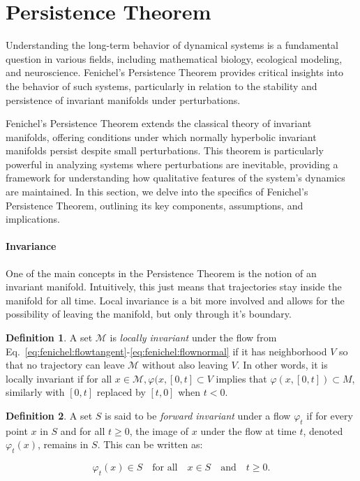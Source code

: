 \documentclass{article} %
\newcounter{ct}
\newcommand{\manifold}{\mathcal{M}}
\theoremstyle{definition}
\newtheorem{definition}{Definition}
\theoremstyle{remark}
\begin{document}
\newpage
\section{Persistence Theorem}\label{sec:supp:persistence_extra}
Understanding the long-term behavior of dynamical systems is a fundamental question in various fields, including mathematical biology, ecological modeling, and neuroscience.
 Fenichel's Persistence Theorem provides critical insights into the behavior of such systems, particularly in relation to the stability and persistence of invariant manifolds under perturbations.

Fenichel's Persistence Theorem extends the classical theory of invariant manifolds, offering conditions under which normally hyperbolic invariant manifolds persist despite small perturbations.
This theorem is particularly powerful in analyzing systems where perturbations are inevitable, providing a  framework for understanding how qualitative features of the system's dynamics are maintained.
In this section, we delve into the specifics of Fenichel's Persistence Theorem, outlining its key components, assumptions, and implications.


\paragraph{Invariance}
One of the main concepts in the Persistence Theorem is the notion of an invariant manifold.
Intuitively, this just means that trajectories stay inside the manifold for all time.
Local invariance is a bit more involved and allows for the possibility of leaving the manifold, but only through it's boundary.

\begin{definition}
A set \(\manifold\) is \emph{locally invariant} under the flow from Eq.~\ref{eq:fenichel:flowtangent}-\ref{eq:fenichel:flownormal} if it has neighborhood \(V\) so that no trajectory can leave \(\manifold\) without also leaving \(V\).
In other words, it is locally invariant if for all \(x \in \manifold, \varphi(x, [0, t] \subset V\) implies that  \(\varphi(x,[0, t]) \subset M\), similarly with \([0, t]\) replaced by \([t, 0]\) when \(t < 0\).
\end{definition}

\begin{definition}
A set \( S \) is said to be \emph{forward invariant} under a flow \( \varphi_{t} \) if for every point \( x \) in \( S \) and for all \( t \geq 0 \), the image of \( x \) under the flow at time \( t \), denoted \( \varphi_{t}(x) \), remains in \( S \). This can be written as:

\[ \varphi_{t}(x) \in S \quad \text{for all} \quad x \in S \quad \text{and} \quad t \geq 0. \]
\end{definition}
\end{document}
